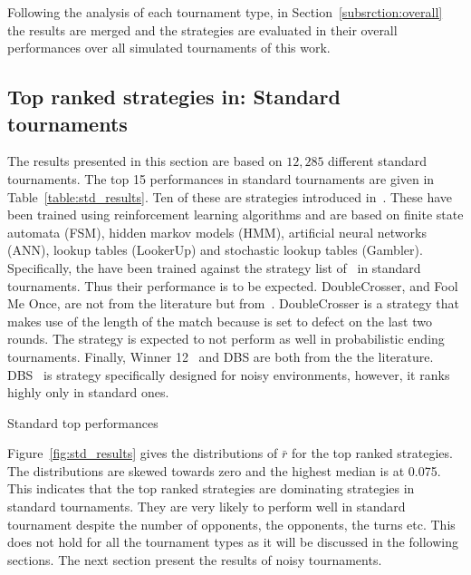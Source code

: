 \documentclass{article}
\begin{document}
Following the analysis of each tournament type, in Section~\ref{subsrction:overall}
the results are merged and the strategies are evaluated in their overall performances
over all simulated tournaments of this work.

\subsection{Top ranked strategies in: Standard tournaments}\label{subsection:standard_tournament}

The results presented in this section are based on $12,285$ different standard
tournaments.
The top 15 performances in standard tournaments are given in
Table~\ref{table:std_results}. Ten of these are strategies introduced
in~\cite{Harper2017}. These have been trained using reinforcement learning
algorithms and are based on finite state automata (FSM), hidden markov models
(HMM), artificial neural networks (ANN), lookup tables (LookerUp) and stochastic
lookup tables (Gambler). Specifically, the have been trained against the
strategy list of~\cite{axelrodproject} in standard tournaments. Thus their
performance is to be expected. DoubleCrosser, and Fool Me Once, are not from
the literature but from~\cite{axelrodproject}. DoubleCrosser is a strategy that
makes use of the length of the match because is set to defect on the last two
rounds. The strategy is expected to not perform as well in probabilistic ending
tournaments. Finally, Winner 12~\cite{Mathieu2017} and DBS are both from the the
literature. DBS~\cite{Au2006} is strategy specifically designed for noisy
environments, however, it ranks highly only in standard ones.

\begin{table}[!htbp]
    \centering
    \resizebox{.28\textwidth}{!}{
    }
    \caption{Standard top performances}\label{table:std_results}
\end{table}

Figure~\ref{fig:std_results} gives the distributions of $\bar{r}$ for the top
ranked strategies. The distributions are skewed towards zero and the highest
median is at 0.075. This indicates that the top ranked strategies are dominating
strategies in standard tournaments. They are very likely to perform well in
standard tournament despite the number of opponents, the opponents, the turns
etc. This does not hold for all the tournament types as it will be discussed
in the following sections. The next section present the results of noisy
tournaments.
\end{document}
